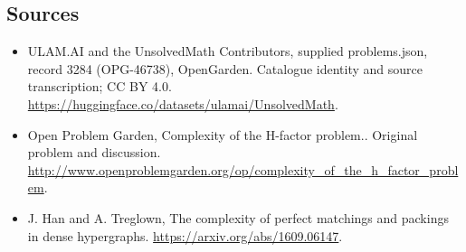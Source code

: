 \documentclass[11pt,a4paper]{article}
\begin{document}
\subsection{Sources}
\begin{itemize}
\item[S1] ULAM.AI and the UnsolvedMath Contributors, supplied problems.json, record 3284 (OPG-46738), OpenGarden. Catalogue identity and source transcription; CC BY 4.0.
\url{https://huggingface.co/datasets/ulamai/UnsolvedMath}.
\item[S2] Open Problem Garden, Complexity of the H-factor problem.. Original problem and discussion.
\url{http://www.openproblemgarden.org/op/complexity_of_the_h_factor_problem}.
\item[S3] J. Han and A. Treglown, The complexity of perfect matchings and packings in dense hypergraphs.
\url{https://arxiv.org/abs/1609.06147}.
\end{itemize}
\end{document}
